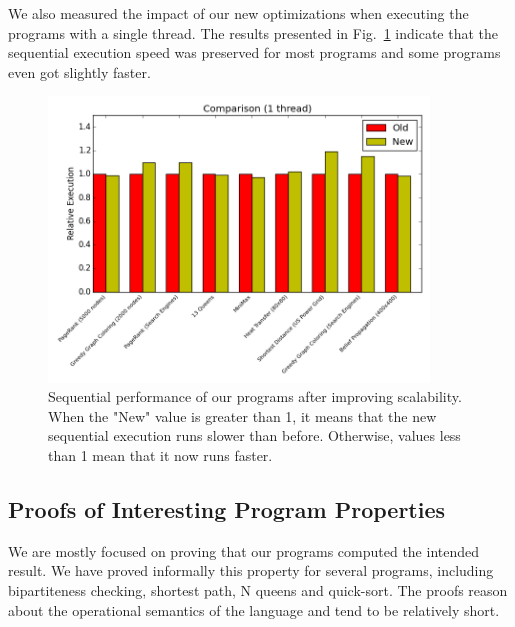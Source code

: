 \documentclass[10pt]{article}
\begin{document}
We also measured the impact of our new optimizations when executing the programs
with a single thread. The results presented in Fig.~\ref{fig:seq} indicate
that the sequential execution speed was preserved for most programs and some
programs even got slightly faster.

\begin{figure}[b]
\begin{center}
   \includegraphics[width=0.9\textwidth]{figures/comparison1}
\end{center}
\caption{Sequential performance of our programs after improving scalability.
   When the "New" value is greater than 1, it means that the new sequential
   execution runs slower than before. Otherwise, values less than 1 mean that it
   now runs faster.}
\label{fig:seq}
\end{figure}

\subsection{Proofs of Interesting Program Properties}

We are mostly focused on proving that our programs computed the intended result.
We have proved informally this property for several programs, including
bipartiteness checking, shortest path, N queens and quick-sort.
The proofs reason about the operational semantics of the language and tend to be
relatively short.
\end{document}
